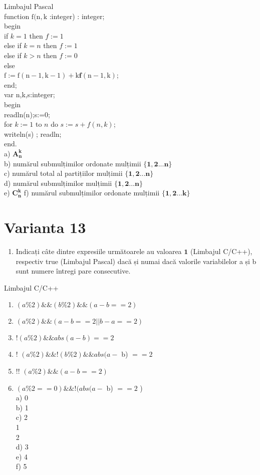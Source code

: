 Limbajul Pascal\\
function $\mathrm{f}(\mathrm{n}, \mathrm{k}$ :integer) : integer;\\
begin\\
if $k=1$ then $f:=1$\\
else if $k=n$ then $f:=1$\\
else if $k>n$ then $f:=0$\\
else\\
$\mathrm{f}:=\mathrm{f}(\mathrm{n}-1, \mathrm{k}-1)+\mathrm{k} \boldsymbol{f}(\mathrm{n}-1, \mathrm{k})$;\\
end;\\
var n,k,s:integer;\\
begin\\
readln(n);s:=0;\\
for $k:=1$ to $n$ do $s:=s+f(n, k)$;\\
writeln(s) ; readln;\\
end.\\
a) $\boldsymbol{A}_{\boldsymbol{n}}^{\boldsymbol{k}}$\\
b) numărul submulțimilor ordonate mulțimii $\{\mathbf{1 , 2 . . . n \}}$\\
c) numărul total al partițiilor mulțimii $\{\mathbf{1 , 2 . . . \mathbf { n } \}}$\\
d) numărul submulțimilor mulțimii $\{\mathbf{1 , 2} . . . \mathbf{n}\}$\\
e) $\boldsymbol{C}_{\boldsymbol{n}}^{\boldsymbol{k}}$ f) numărul submulțimilor ordonate mulțimii $\{\mathbf{1 , 2 . . . k}\}$

\section*{Varianta 13}
\begin{enumerate}
  \item Indicați câte dintre expresiile următoarele au valoarea $\mathbf{1}$ (Limbajul C/C++), respectiv true (Limbajul Pascal) dacă și numai dacă valorile variabilelor a și b sunt numere întregi pare consecutive.
\end{enumerate}

Limbajul C/C++

\begin{enumerate}
  \item $(a \% 2) \& \&(b \% 2) \& \&(a-b==2)$
  \item $(a \% 2) \& \&(a-b==2| | b-a==2)$
  \item $!(a \% 2) \& \& a b s(a-b)==2$
  \item ! $(a \% 2) \& \&!(b \% 2) \& \& a b s(a-$ b) $==2$
  \item !! $(a \% 2) \& \&(a-b==2)$
  \item $(a \% 2==0) \& \&!(a b s(a-$ b) $==2$ )\\
a) 0\\
b) 1\\
c) 2\\
1\\
2\\
d) 3\\
e) 4\\
f) 5
\end{enumerate}

